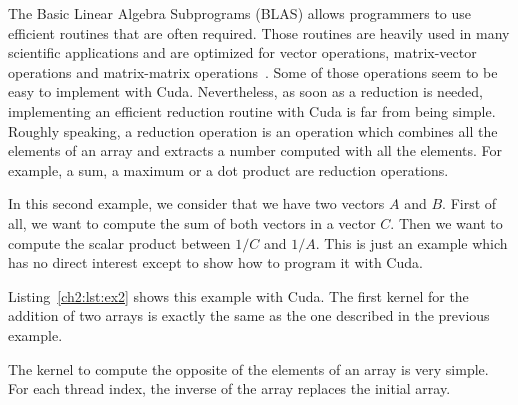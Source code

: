 The Basic Linear Algebra Subprograms  (BLAS) allows programmers to use efficient
routines  that are  often  required. Those  routines  are heavily  used in  many
scientific applications  and are optimized for  vector operations, matrix-vector
operations                           and                           matrix-matrix
operations~\cite{ch2:journals/ijhpca/Dongarra02}. Some  of those operations seem
to be  easy to  implement with Cuda.   Nevertheless, as  soon as a  reduction is
needed, implementing an efficient reduction routine with Cuda is far from being
simple. Roughly speaking, a reduction operation is an
operation  which combines  all the  elements of  an array  and extracts  a number
computed with all the  elements. For example, a sum, a maximum  or a dot product
are reduction operations.

In this second example, we consider that  we have two vectors $A$ and $B$. First
of all, we want to compute the sum  of both vectors in a vector $C$. Then we want
to compute the  scalar product between $1/C$ and $1/A$. This  is just an example
which has no direct interest except to show how to program it with Cuda.

Listing~\ref{ch2:lst:ex2} shows this example with Cuda. The first kernel for the
addition  of two  arrays  is exactly  the same  as  the one  described in  the
previous example.

The  kernel  to  compute the  opposite  of  the  elements  of  an array  is  very
simple. For  each thread index,  the inverse of  the array replaces  the initial
array.

